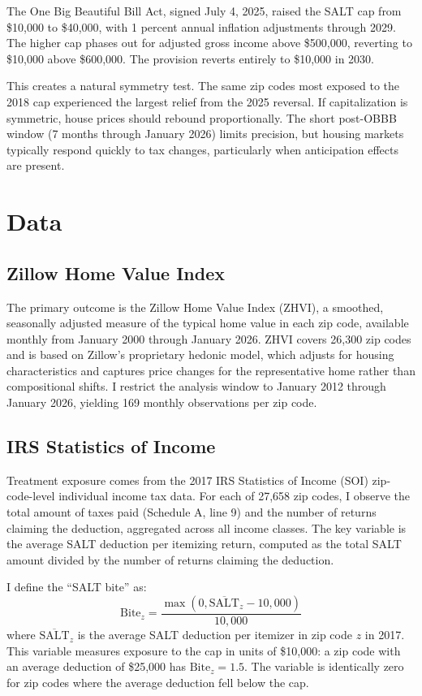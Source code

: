 \documentclass[12pt]{article}
\begin{document}
The One Big Beautiful Bill Act, signed July 4, 2025, raised the SALT cap from \$10,000 to \$40,000, with 1 percent annual inflation adjustments through 2029. The higher cap phases out for adjusted gross income above \$500,000, reverting to \$10,000 above \$600,000. The provision reverts entirely to \$10,000 in 2030.

This creates a natural symmetry test. The same zip codes most exposed to the 2018 cap experienced the largest relief from the 2025 reversal. If capitalization is symmetric, house prices should rebound proportionally. The short post-OBBB window (7 months through January 2026) limits precision, but housing markets typically respond quickly to tax changes, particularly when anticipation effects are present.

\section{Data}

\subsection{Zillow Home Value Index}

The primary outcome is the Zillow Home Value Index (ZHVI), a smoothed, seasonally adjusted measure of the typical home value in each zip code, available monthly from January 2000 through January 2026. ZHVI covers 26,300 zip codes and is based on Zillow's proprietary hedonic model, which adjusts for housing characteristics and captures price changes for the representative home rather than compositional shifts. I restrict the analysis window to January 2012 through January 2026, yielding 169 monthly observations per zip code.

\subsection{IRS Statistics of Income}

Treatment exposure comes from the 2017 IRS Statistics of Income (SOI) zip-code-level individual income tax data. For each of 27,658 zip codes, I observe the total amount of taxes paid (Schedule A, line 9) and the number of returns claiming the deduction, aggregated across all income classes. The key variable is the average SALT deduction per itemizing return, computed as the total SALT amount divided by the number of returns claiming the deduction.

I define the ``SALT bite'' as:
\begin{equation}
\text{Bite}_z = \frac{\max(0, \overline{\text{SALT}}_z - 10{,}000)}{10{,}000}
\end{equation}
where $\overline{\text{SALT}}_z$ is the average SALT deduction per itemizer in zip code $z$ in 2017. This variable measures exposure to the cap in units of \$10,000: a zip code with an average deduction of \$25,000 has $\text{Bite}_z = 1.5$. The variable is identically zero for zip codes where the average deduction fell below the cap.
\end{document}
